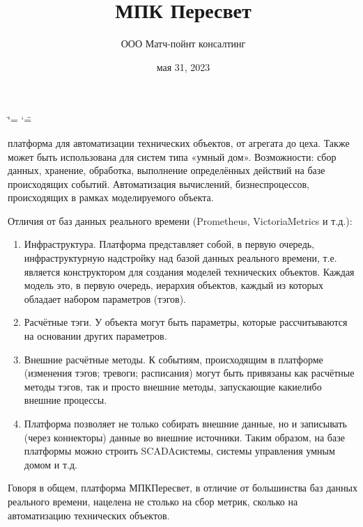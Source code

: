 \documentclass[a4paper,10pt,russian]{sphinxmanual}
\title{МПК Пересвет}
\date{мая 31, 2023}
\author{ООО Матч-пойнт консалтинг}
\begin{document}
\ifdefined\shorthandoff
  \ifnum\catcode`\=\string=\active\shorthandoff{=}\fi
  \ifnum\catcode`\"=\active{}\fi
\fi

\pagestyle{empty}
\sphinxmaketitle
\pagestyle{plain}
\sphinxtableofcontents
\pagestyle{normal}
\label{\detokenize{index::doc}}


\sphinxAtStartPar
{} \sphinxhyphen{} платформа для автоматизации технических объектов,
от агрегата до цеха. Также может быть использована для систем типа «умный дом».
Возможности: сбор данных, хранение, обработка,
выполнение определённых действий на базе происходящих событий.
Автоматизация вычислений, бизнес\sphinxhyphen{}процессов, происходящих в рамках моделируемого
объекта.

\sphinxAtStartPar
Отличия от баз данных реального времени (Prometheus, VictoriaMetrics и т.д.):
\begin{enumerate}
%
\item {}
\sphinxAtStartPar
Инфраструктура. Платформа представляет собой, в первую очередь,
инфраструктурную надстройку над базой данных реального времени,
т.е. является конструктором для создания моделей технических объектов.
Каждая модель \sphinxhyphen{} это, в первую очередь, иерархия объектов, каждый из которых
обладает набором параметров (тэгов).

\item {}
\sphinxAtStartPar
Расчётные тэги. У объекта могут быть параметры, которые рассчитываются
на основании других параметров.

\item {}
\sphinxAtStartPar
Внешние расчётные методы. К событиям, происходящим в платформе
(изменения тэгов; тревоги; расписания) могут быть
привязаны как расчётные методы тэгов, так и просто внешние методы,
запускающие какие\sphinxhyphen{}либо внешние процессы.

\item {}
\sphinxAtStartPar
Платформа позволяет не только собирать внешние данные, но и записывать
(через коннекторы) данные во внешние источники.
Таким образом, на базе платформы можно строить SCADA\sphinxhyphen{}системы,
системы управления умным домом и т.д.

\end{enumerate}

\sphinxAtStartPar
Говоря в общем, платформа МПК\sphinxhyphen{}Пересвет, в отличие от большинства баз данных
реального времени, нацелена не столько на сбор метрик,
сколько на автоматизацию технических объектов.
\end{document}
